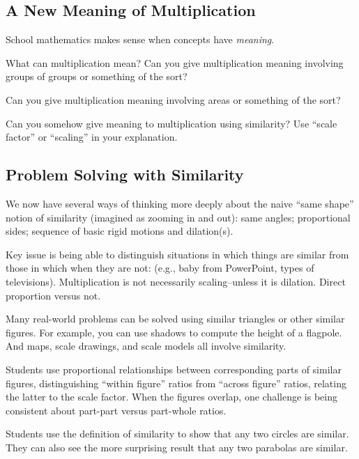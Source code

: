 \subsection{A New Meaning of Multiplication}
School mathematics makes sense when concepts have \emph{meaning}.  

\begin{question} 
What can multiplication mean?  Can you give multiplication meaning involving groups of groups or
something of the sort?
\end{question}
\QM

\begin{question} 
Can you give multiplication meaning involving areas or something of the sort?
\end{question}
\QM

\begin{question} 
Can you somehow give meaning to multiplication using similarity?  Use ``scale factor'' or ``scaling'' in your explanation.
\end{question}
\QM

\newpage 

\subsection{Problem Solving with Similarity} 
We now have several ways of thinking more deeply about the naive ``same shape'' notion of similarity (imagined as zooming in and out): same angles; proportional sides; sequence of basic rigid motions and dilation(s).  

Key issue is being able to distinguish situations in which things are similar from those in which when they are not:  (e.g., baby from PowerPoint, types of televisions).  Multiplication is not necessarily scaling--unless it is dilation.  Direct proportion versus not.  

Many real-world problems can be solved using similar triangles or other similar figures.  For example, you can use shadows to compute the height of a flagpole.  And maps, scale drawings, and scale models all involve similarity.  

Students use proportional relationships between corresponding parts of similar figures, distinguishing ``within figure'' ratios from ``across figure'' ratios, relating the latter to the scale factor.  When the figures overlap, one challenge is being consistent about part-part versus part-whole ratios.

Students use the definition of similarity to show that any two circles are similar.  They can also see the more surprising result that any two parabolas are similar.  

